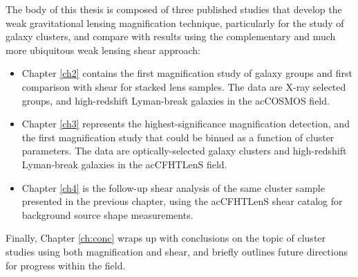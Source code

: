 The body of this thesis is composed of three published studies that develop the weak gravitational lensing magnification technique, particularly for the study of galaxy clusters, and compare with results using the complementary and much more ubiquitous weak lensing shear approach:
\begin{itemize}
\item Chapter \ref{ch2} contains the first magnification study of galaxy groups and first comparison with shear for stacked lens samples. The data are X-ray selected groups, and high-redshift Lyman-break galaxies in the ac{COSMOS} field.
\item Chapter \ref{ch3} represents the highest-significance magnification detection, and the first magnification study that could be binned as a function of cluster parameters. The data are optically-selected galaxy clusters and high-redshift Lyman-break galaxies in the ac{CFHTLenS} field.
\item Chapter \ref{ch4} is the follow-up shear analysis of the same cluster sample presented in the previous chapter, using the ac{CFHTLenS} shear catalog for background source shape measurements.
\end{itemize}
Finally, Chapter \ref{ch:conc} wraps up with conclusions on the topic of cluster studies using both magnification and shear, and briefly outlines future directions for progress within the field.

\endinput
Any text after an \endinput is ignored.
You could put scraps here or things in progress.
